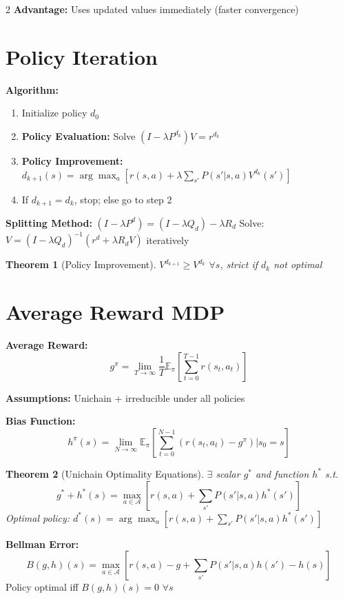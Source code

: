 \documentclass[8pt]{extarticle}
\newtheorem{theorem}{Theorem}
\begin{document}
\begin{multicols}{2}
\textbf{Advantage:} Uses updated values immediately (faster convergence)

\section*{\textcolor{algorithmgreen}{Policy Iteration}}
\textbf{Algorithm:}
\begin{enumerate}[leftmargin=*]
    \item Initialize policy $d_0$
    \item \textbf{Policy Evaluation:} Solve $(I-\lambda P^{d_k})V = r^{d_k}$
    \item \textbf{Policy Improvement:} $d_{k+1}(s) = \arg\max_a [r(s,a) + \lambda \sum_{s'} P(s'|s,a) V^{d_k}(s')]$
    \item If $d_{k+1} = d_k$, stop; else go to step 2
\end{enumerate}

\textbf{Splitting Method:} $(I-\lambda P^d) = (I-\lambda Q_d) - \lambda R_d$
Solve: $V = (I-\lambda Q_d)^{-1}(r^d + \lambda R_d V)$ iteratively

\begin{theorem}[Policy Improvement]
$V^{d_{k+1}} \geq V^{d_k}$ $\forall s$, strict if $d_k$ not optimal
\end{theorem}

\section*{\textcolor{theoremblue}{Average Reward MDP}}
\textbf{Average Reward:}
$$g^\pi = \lim_{T \to \infty} \frac{1}{T} \mathbb{E}_\pi\left[\sum_{t=0}^{T-1} r(s_t, a_t)\right]$$

\textbf{Assumptions:} Unichain + irreducible under all policies

\textbf{Bias Function:}
$$h^\pi(s) = \lim_{N \to \infty} \mathbb{E}_\pi\left[\sum_{t=0}^{N-1} (r(s_t, a_t) - g^\pi) | s_0 = s\right]$$

\begin{theorem}[Unichain Optimality Equations]
$\exists$ scalar $g^*$ and function $h^*$ s.t.
$$g^* + h^*(s) = \max_{a \in \mathcal{A}} \left[r(s,a) + \sum_{s'} P(s'|s,a) h^*(s')\right]$$
Optimal policy: $d^*(s) = \arg\max_a [r(s,a) + \sum_{s'} P(s'|s,a) h^*(s')]$
\end{theorem}

\textbf{Bellman Error:}
$$B(g,h)(s) = \max_{a \in \mathcal{A}} \left[r(s,a) - g + \sum_{s'} P(s'|s,a) h(s') - h(s)\right]$$
Policy optimal iff $B(g,h)(s) = 0$ $\forall s$


\end{multicols}
\end{document}
